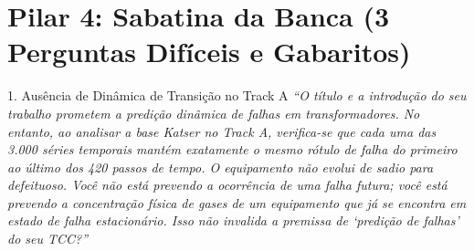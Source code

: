 \documentclass[11pt,a4paper]{article}
\begin{document}
\section{Pilar 4: Sabatina da Banca (3 Perguntas Difíceis e Gabaritos)}

\begin{boardQuestion}{1. Ausência de Dinâmica de Transição no Track A}
\textit{“O título e a introdução do seu trabalho prometem a predição dinâmica de falhas em transformadores. No entanto, ao analisar a base Katser no Track A, verifica-se que cada uma das 3.000 séries temporais mantém exatamente o mesmo rótulo de falha do primeiro ao último dos 420 passos de tempo. O equipamento não evolui de sadio para defeituoso. Você não está prevendo a ocorrência de uma falha futura; você está prevendo a concentração física de gases de um equipamento que já se encontra em estado de falha estacionário. Isso não invalida a premissa de `predição de falhas' do seu TCC?”}
\end{boardQuestion}
\end{document}
